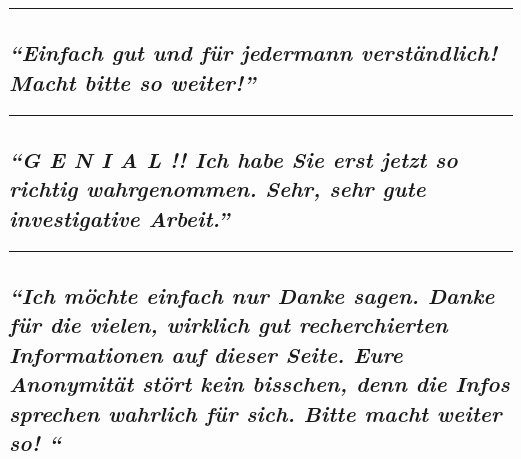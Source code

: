 \begin{center}\rule{0.5\linewidth}{\linethickness}\end{center}

\hypertarget{einfach-gut-und-fuxfcr-jedermann-verstuxe4ndlich-macht-bitte-so-weiter}{%
\subsection{\texorpdfstring{\emph{``Einfach gut und für jedermann
verständlich! Macht bitte so
weiter!''}}{``Einfach gut und für jedermann verständlich! Macht bitte so weiter!''}}\label{einfach-gut-und-fuxfcr-jedermann-verstuxe4ndlich-macht-bitte-so-weiter}}

\begin{center}\rule{0.5\linewidth}{\linethickness}\end{center}

\hypertarget{g-e-n-i-a-l--ich-habe-sie-erst-jetzt-so-richtig-wahrgenommen-sehr-sehr-gute-investigative-arbeit}{%
\subsection{\texorpdfstring{\emph{``G E N I A L !! Ich habe Sie erst
jetzt so richtig wahrgenommen. Sehr, sehr gute investigative
Arbeit.''}}{``G E N I A L !! Ich habe Sie erst jetzt so richtig wahrgenommen. Sehr, sehr gute investigative Arbeit.''}}\label{g-e-n-i-a-l--ich-habe-sie-erst-jetzt-so-richtig-wahrgenommen-sehr-sehr-gute-investigative-arbeit}}

\begin{center}\rule{0.5\linewidth}{\linethickness}\end{center}

\hypertarget{ich-muxf6chte-einfach-nur-danke-sagen-danke-fuxfcr-die-vielen-wirklich-gut-recherchierten-informationen-auf-dieser-seite-eure-anonymituxe4t-stuxf6rt-kein-bisschen-denn-die-infos-sprechen-wahrlich-fuxfcr-sich-bitte-macht-weiter-so-}{%
\subsection{\texorpdfstring{\emph{``Ich möchte einfach nur Danke sagen.
Danke für die vielen, wirklich gut recherchierten Informationen auf
dieser Seite. Eure Anonymität stört kein bisschen, denn die Infos
sprechen wahrlich für sich. Bitte macht weiter so!
``}}{``Ich möchte einfach nur Danke sagen. Danke für die vielen, wirklich gut recherchierten Informationen auf dieser Seite. Eure Anonymität stört kein bisschen, denn die Infos sprechen wahrlich für sich. Bitte macht weiter so! ``}}\label{ich-muxf6chte-einfach-nur-danke-sagen-danke-fuxfcr-die-vielen-wirklich-gut-recherchierten-informationen-auf-dieser-seite-eure-anonymituxe4t-stuxf6rt-kein-bisschen-denn-die-infos-sprechen-wahrlich-fuxfcr-sich-bitte-macht-weiter-so-}}

